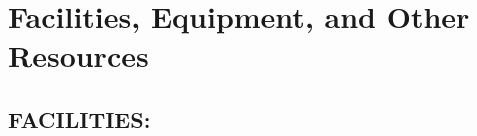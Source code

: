 \documentclass[11pt]{memoir}
\def\ni{\noindent}
\def\bs{\bigskip}
\begin{document}
\mainmatter
\pagestyle{bodystyle}

\noindent
\section*{Facilities, Equipment, and Other Resources}


\bs
\subsection*{\small FACILITIES:}
\end{document}
